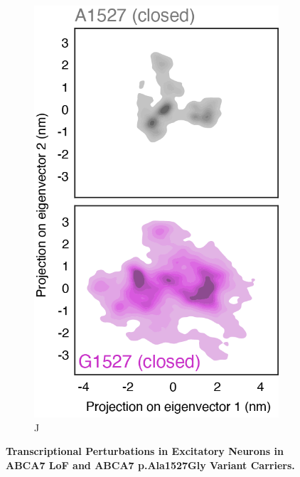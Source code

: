 \begin{figure}[H]
\begin{subfigure}[t]{0.32\textwidth}
    \end{subfigure}
    \begin{subfigure}[t]{0.16\textwidth}
        \caption{J}
        \includegraphics[width=\textwidth]{./main_plots/variant_projection_closed.png}        
    \end{subfigure}
    \caption{
        \textbf{Transcriptional Perturbations in Excitatory Neurons in ABCA7 LoF and ABCA7 p.Ala1527Gly Variant Carriers.}\\
    }
    \label{fig:main_neurons}
\end{figure}
